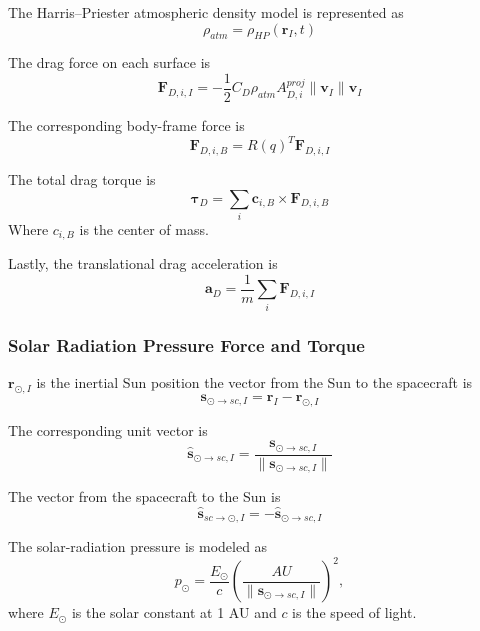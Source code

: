 \documentclass[conference,onecolumn,draftclsnofoot]{IEEEtran}
\begin{document}
The Harris--Priester atmospheric density model is represented as~\cite{harris1962upperAtmosphere}
\begin{equation}
\rho_{atm}
=
\rho_{HP}(\mathbf r_I,t)
\end{equation}

The drag force on each surface is
\begin{equation}
\mathbf F_{D,i,I}
=
-\frac{1}{2}
C_D
\rho_{atm}
A_{D,i}^{proj}
\|\mathbf v_I\|
\mathbf v_I
\end{equation}

The corresponding body-frame force is
\begin{equation}
\mathbf F_{D,i,B}
=
R(q)^T\mathbf F_{D,i,I}
\end{equation}

The total drag torque is
\begin{equation}
\boldsymbol{\tau}_{D}
=
\sum_i
\mathbf c_{i,B}
\times
\mathbf F_{D,i,B}
\end{equation}
Where $c_{i,B}$ is the center of mass.

Lastly, the translational drag acceleration is
\begin{equation}
\mathbf a_D
=
\frac{1}{m}
\sum_i
\mathbf F_{D,i,I}
\end{equation}

\subsubsection{Solar Radiation Pressure Force and Torque}

\(\mathbf r_{\odot,I}\) is the inertial Sun position the vector
from the Sun to the spacecraft is
\begin{equation}
\mathbf s_{\odot\rightarrow sc,I}
=
\mathbf r_I-\mathbf r_{\odot,I}
\end{equation}

The corresponding unit vector is
\begin{equation}
\hat{\mathbf s}_{\odot\rightarrow sc,I}
=
\frac{
\mathbf s_{\odot\rightarrow sc,I}
}{
\|\mathbf s_{\odot\rightarrow sc,I}\|
}
\end{equation}

The vector from the spacecraft to the Sun is
\begin{equation}
\hat{\mathbf s}_{sc\rightarrow\odot,I}
=
-\hat{\mathbf s}_{\odot\rightarrow sc,I}
\end{equation}

The solar-radiation pressure is modeled as
\begin{equation}
p_{\odot}
=
\frac{E_{\odot}}{c}
\left(
\frac{AU}{
\|\mathbf s_{\odot\rightarrow sc,I}\|
}
\right)^2,
\end{equation}
where \(E_{\odot}\) is the solar constant at 1 AU and \(c\) is the speed of light.
\end{document}
